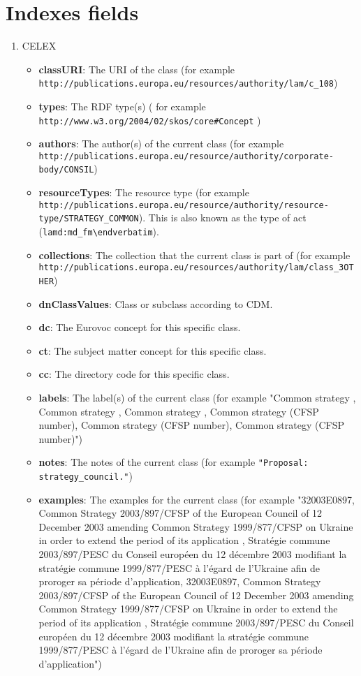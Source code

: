 \section{Indexes fields}
\label{sec:indexes_fields}
\begin{enumerate}
	\item CELEX
	\begin{itemize}
		\item \textbf{classURI}: The URI of the class (for example \lstinline!http://publications.europa.eu/resources/authority/lam/c_108!)
		\item \textbf{types}: The RDF type(s) ( for example \lstinline!http://www.w3.org/2004/02/skos/core#Concept! )
		\item \textbf{authors}: The author(s) of the current class (for example \lstinline!http://publications.europa.eu/resource/authority/corporate-body/CONSIL!)
		\item \textbf{resourceTypes}: The resource type (for example \lstinline!http://publications.europa.eu/resource/authority/resource-type/STRATEGY_COMMON!). This is also known as the type of act (\lstinline!lamd:md_fm\endverbatim!).
		\item \textbf{collections}: The collection that the current class is part of (for example \lstinline!http://publications.europa.eu/resources/authority/lam/class_3OTHER!)
		\item \textbf{dnClassValues}: Class or subclass according to CDM.
		\item \textbf{dc}: The Eurovoc concept for this specific class.
		\item \textbf{ct}: The subject matter concept for this specific class.
		\item \textbf{cc}: The directory code for this specific class.
		\item \textbf{labels}: The label(s) of the current class (for example "Common strategy , Common strategy , Common strategy , Common strategy (CFSP number), Common strategy (CFSP number), Common strategy (CFSP number)")
		\item \textbf{notes}: The notes of the current class (for example \lstinline!"Proposal: strategy_council."!)
		\item \textbf{examples}: The examples for the current class (for example "32003E0897, Common Strategy 2003/897/CFSP of the European Council of 12 December 2003 amending Common Strategy 1999/877/CFSP on Ukraine in order to extend the period of its application , Stratégie commune 2003/897/PESC du Conseil européen du 12 décembre 2003 modifiant la stratégie commune 1999/877/PESC à l'égard de l'Ukraine afin de proroger sa période d'application, 32003E0897, Common Strategy 2003/897/CFSP of the European Council of 12 December 2003 amending Common Strategy 1999/877/CFSP on Ukraine in order to extend the period of its application , Stratégie commune 2003/897/PESC du Conseil européen du 12 décembre 2003 modifiant la stratégie commune 1999/877/PESC à l'égard de l'Ukraine afin de proroger sa période d'application")

\end{itemize}
\end{enumerate}
